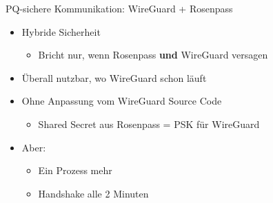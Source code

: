 \documentclass{rosenpass-beamer}
\newcommand*{\imgNote}[1]{\begin{center}\setlength{\parskip}{0pt}\tiny\raggedright#1\end{center}}
\begin{document}
\begin{frame}{PQ-sichere Kommunikation: WireGuard + Rosenpass}
\begin{itemize}
\item  Hybride Sicherheit

  \begin{itemize}
    \item Bricht nur, wenn Rosenpass \textbf{und} WireGuard versagen
  \end{itemize}
\item  Überall nutzbar, wo WireGuard schon läuft
\item  Ohne Anpassung vom WireGuard Source Code

  \begin{itemize}
    \item Shared Secret aus Rosenpass = PSK für WireGuard
  \end{itemize}
\item  Aber:

  \begin{itemize}
    \item Ein Prozess mehr
  \item Handshake alle 2 Minuten
  \end{itemize}
\end{itemize}


\imgNote{}
\end{frame}
\end{document}
